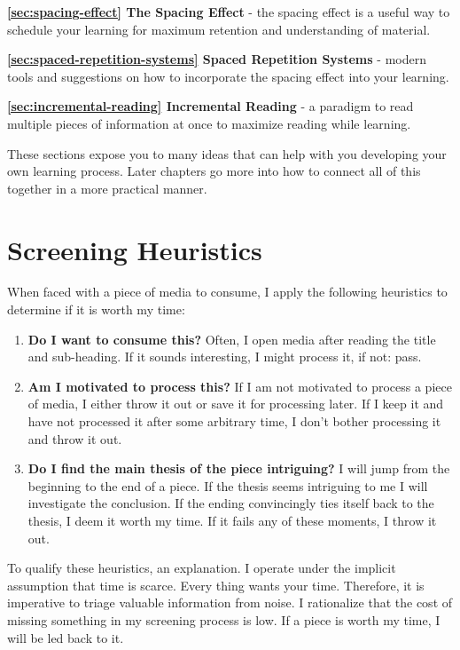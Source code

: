 \documentclass[
  notoc %
]{tufte-book}
\begin{document}
\textbf{\ref{sec:spacing-effect} The Spacing Effect} - the spacing
effect is a useful way to schedule your learning for maximum retention
and understanding of material.

\textbf{\ref{sec:spaced-repetition-systems} Spaced Repetition Systems} -
modern tools and suggestions on how to incorporate the spacing effect
into your learning.

\textbf{\ref{sec:incremental-reading} Incremental Reading} - a paradigm
to read multiple pieces of information at once to maximize reading while
learning.

These sections expose you to many ideas that can help with you
developing your own learning process. Later chapters go more into how to
connect all of this together in a more practical manner.

\hypertarget{sec:screening-heuristics}{%
\section{Screening Heuristics}\label{sec:screening-heuristics}}

When faced with a piece of media to consume, I apply the following
heuristics to determine if it is worth my time:

\begin{enumerate}
\def\labelenumi{\arabic{enumi}.}
\item
  \textbf{Do I want to consume this?} Often, I open media after reading
  the title and sub-heading. If it sounds interesting, I might process
  it, if not: pass.
\item
  \textbf{Am I motivated to process this?} If I am not motivated to
  process a piece of media, I either throw it out or save it for
  processing later. If I keep it and have not processed it after some
  arbitrary time, I don't bother processing it and throw it out.
\item
  \textbf{Do I find the main thesis of the piece intriguing?} I will
  jump from the beginning to the end of a piece. If the thesis seems
  intriguing to me I will investigate the conclusion. If the ending
  convincingly ties itself back to the thesis, I deem it worth my time.
  If it fails any of these moments, I throw it out.
\end{enumerate}

To qualify these heuristics, an explanation. I operate under the
implicit assumption that time is scarce. Every thing wants your time.
Therefore, it is imperative to triage valuable information from noise. I
rationalize that the cost of missing something in my screening process
is low. If a piece is worth my time, I will be led back to it.
\end{document}
